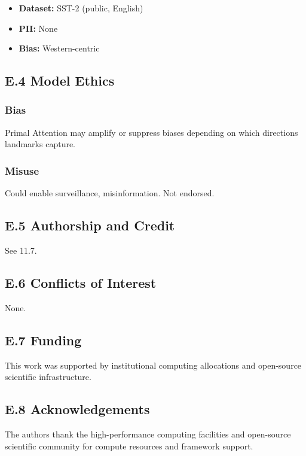 \begin{itemize}
\item \textbf{Dataset:} SST-2 (public, English)
\item \textbf{PII:} None
\item \textbf{Bias:} Western-centric

\end{itemize}
\subsection{E.4 Model Ethics}

\subsubsection{Bias}

Primal Attention may amplify or suppress biases depending on which directions 
landmarks capture.

\subsubsection{Misuse}

Could enable surveillance, misinformation. Not endorsed.

\subsection{E.5 Authorship and Credit}

See  11.7.

\subsection{E.6 Conflicts of Interest}

None.

\subsection{E.7 Funding}

This work was supported by institutional computing allocations and open-source scientific infrastructure.

\subsection{E.8 Acknowledgements}

The authors thank the high-performance computing facilities and open-source scientific community for compute resources and framework support.


